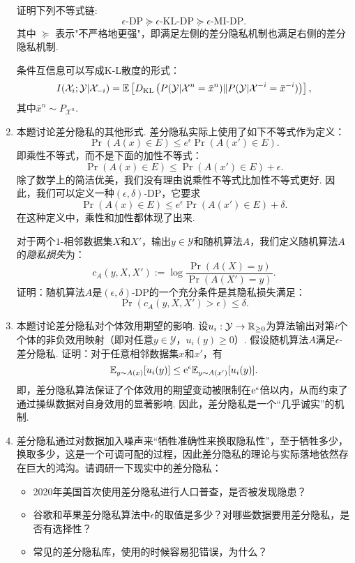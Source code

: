 \begin{enumerate}[wide, labelindent=0pt]
    证明下列不等式链:
    \[
        \epsilon\text{-DP} \succeq \epsilon\text{-KL-DP} \succeq \epsilon\text{-MI-DP}.
    \]
    其中 $\succeq$ 表示"不严格地更强"，即满足左侧的差分隐私机制也满足右侧的差分隐私机制.
    \begin{hint}
        条件互信息可以写成K-L散度的形式：
            \[
                I(\mathcal X_{i};\mathcal Y|\mathcal X_{-i}) = \mathbb{E} \left[D_{\mathrm{KL}}\left(P(\mathcal Y|\mathcal X^{n}=\bar{x}^n)\Vert P(\mathcal Y|\mathcal X^{-i}=\bar{x}^{-i})\right)\right],
            \]
            其中$\bar{x}^n \sim P_{\mathcal X^n}$.
    \end{hint}

    \item 本题讨论差分隐私的其他形式. 差分隐私实际上使用了如下不等式作为定义：
    \[\Pr(A(x)\in E) \leq e^{\epsilon} \Pr(A(x') \in E).\]
    即乘性不等式，而不是下面的加性不等式：
    \[\Pr(A(x)\in E) \leq \Pr(A(x') \in E) + \epsilon.\]
    除了数学上的简洁优美，我们没有理由说乘性不等式比加性不等式更好. 因此，我们可以定义一种$(\epsilon, \delta)$-DP，它要求
    \[
    \Pr(A(x)\in E) \leq e^{\epsilon} \Pr(A(x') \in E) + \delta.
    \]
    在这种定义中，乘性和加性都体现了出来. 
    
    对于两个$1$-相邻数据集$X$和$X'$，输出$y \in \mathcal Y$和随机算法$A$，我们定义随机算法$A$的\textit{隐私损失}为：
    \[
        c_A(y,  X, X') := \log \frac{\Pr(A( X) = y)}{\Pr(A( X') = y)}.
    \]
    证明：随机算法$A$是$(\epsilon, \delta)$-DP的一个充分条件是其隐私损失满足：
    \[
        \Pr(c_A(y,  X,  X') > \epsilon) \leq \delta.
    \]

    \item 本题讨论差分隐私对个体效用期望的影响. 设$u_i: \mathcal{Y} \to \mathbb{R}_{\geq 0}$为算法输出对第$i$个个体的非负效用映射（即对任意$y \in \mathcal{Y}$，$u_i(y) \geq 0$）. 假设随机算法$A$满足$\epsilon$-差分隐私. 证明：对于任意相邻数据集$x$和$x'$，有  
    \[
    \mathbb{E}_{y \sim A(x)}[u_i(y)] \leq \mathrm{e}^{\epsilon} \mathbb{E}_{y \sim A(x')}[u_i(y)].
    \]  
    即，差分隐私算法保证了个体效用的期望变动被限制在$\mathrm{e}^{\epsilon}$倍以内，从而约束了通过操纵数据对自身效用的显著影响. 因此，差分隐私是一个“几乎诚实”的机制. 

    \item 差分隐私通过对数据加入噪声来“牺牲准确性来换取隐私性”，至于牺牲多少，换取多少，这是一个可调可配的过程，因此差分隐私的理论与实际落地依然存在巨大的鸿沟。请调研一下现实中的差分隐私：
    \begin{itemize}
        \item 2020年美国首次使用差分隐私进行人口普查，是否被发现隐患？
        \item 谷歌和苹果差分隐私算法中$\epsilon$的取值是多少？对哪些数据要用差分隐私，是否有选择性？
        \item 常见的差分隐私库，使用的时候容易犯错误，为什么？
    \end{itemize}

\end{enumerate}


